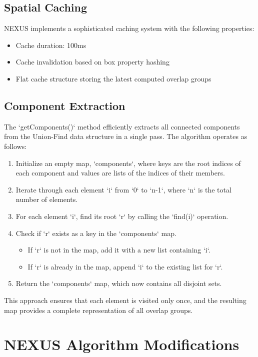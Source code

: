 \documentclass[10pt]{article}
\begin{document}
\subsection{Spatial Caching}
NEXUS implements a sophisticated caching system with the following properties:
\begin{itemize}
    \item Cache duration: 100ms
    \item Cache invalidation based on box property hashing
    \item Flat cache structure storing the latest computed overlap groups
\end{itemize}

\subsection{Component Extraction}
The `getComponents()` method efficiently extracts all connected components from the Union-Find data structure in a single pass. The algorithm operates as follows:

\begin{enumerate}
    \item Initialize an empty map, `components`, where keys are the root indices of each component and values are lists of the indices of their members.
    \item Iterate through each element `i` from `0` to `n-1`, where `n` is the total number of elements.
    \item For each element `i`, find its root `r` by calling the `find(i)` operation.
    \item Check if `r` exists as a key in the `components` map.
    \begin{itemize}
        \item If `r` is not in the map, add it with a new list containing `i`.
        \item If `r` is already in the map, append `i` to the existing list for `r`.
    \end{itemize}
    \item Return the `components` map, which now contains all disjoint sets.
\end{enumerate}

This approach ensures that each element is visited only once, and the resulting map provides a complete representation of all overlap groups.

\section{NEXUS Algorithm Modifications}
\end{document}
